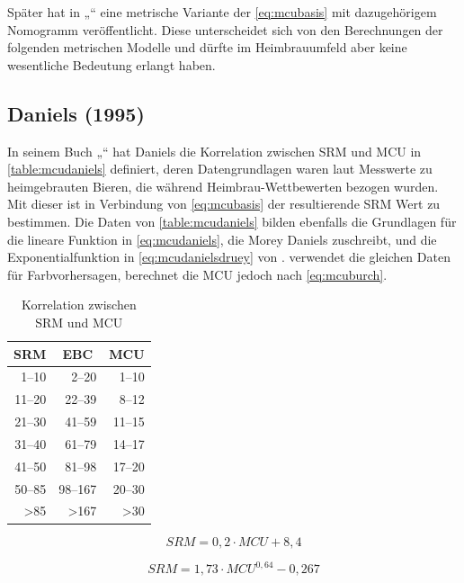 \documentclass[a4paper,parskip=half]{scrartcl}
\newcommand{\MCUL}{\mathit{MCU}}
\newcommand{\SRM}{\mathit{SRM}}
\begin{document}
Später hat \textcite[258]{Mosher2015} in „“ eine metrische Variante der \autoref{eq:mcubasis} mit dazugehörigem Nomogramm veröffentlicht. Diese unterscheidet sich von den Berechnungen der folgenden metrischen Modelle und dürfte im Heimbrauumfeld aber keine wesentliche Bedeutung erlangt haben.

\subsection*{Daniels (1995)}

In seinem Buch „“ hat Daniels die Korrelation zwischen SRM und MCU in \autoref{table:mcudaniels} definiert, deren Datengrundlagen waren laut \textcite{Morey2004} Messwerte zu heimgebrauten Bieren, die während Heimbrau-Wettbewerten bezogen wurden. Mit dieser ist in Verbindung von \autoref{eq:mcubasis} der resultierende SRM Wert zu bestimmen. Die Daten von \autoref{table:mcudaniels} bilden ebenfalls die Grundlagen für die lineare Funktion in \autoref{eq:mcudaniels}, die Morey Daniels zuschreibt, und die Exponentialfunktion in \autoref{eq:mcudanielsdruey} von \textcite{Druey1998}. \textcite[10]{Holle2010} verwendet die gleichen Daten für Farbvorhersagen, berechnet die MCU jedoch nach \autoref{eq:mcuburch}.

\begin{table}[H]
\centering
\begin{tabular}{rrr}
\toprule
\multicolumn{1}{c}{\textbf{SRM}} & \multicolumn{1}{c}{\textbf{EBC}} & \multicolumn{1}{c}{\textbf{MCU}} \\
\midrule
1–10 & 2–20 & 1–10 \\
11–20 & 22–39 & 8–12 \\
21–30 & 41–59 & 11–15 \\
31–40 & 61–79 & 14–17 \\
41–50 & 81–98 & 17–20 \\
50–85 & 98–167 & 20–30 \\
>85 & >167 & >30 \\
\bottomrule
\end{tabular}
\caption{Korrelation zwischen SRM und MCU \parencite[61]{Daniels1996}}
\label{table:mcudaniels}
\end{table}

\begin{equation}
\SRM = 0,2 \cdot \MCUL + 8,4
\label{eq:mcudaniels}
\end{equation}

\begin{equation}
\SRM = 1,73 \cdot \MCUL^{0,64} - 0,267
\label{eq:mcudanielsdruey}
\end{equation}
\end{document}
